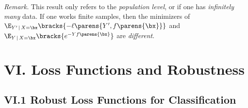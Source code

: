 \documentclass[12pt]{article}
\begin{document}
\begin{enumerate}[label=\textbf{\arabic*.}]
	\textit{Remark.} This result only refers to the \emph{population level}, or if one has \emph{infinitely many} data. If one works finite samples, then the minimizers of $\E_{Y' \,\vert\, X = \bx} \bracks{- \ell \parens{Y', f \parens{\bx}}}$ and $\E_{Y \,\vert\, X = \bx} \bracks{e^{- Y f \parens{\bx}}}$ are \emph{different}. 

\end{enumerate}


\section*{VI. Loss Functions and Robustness}

\subsection*{VI.1 Robust Loss Functions for Classification}
\end{document}
